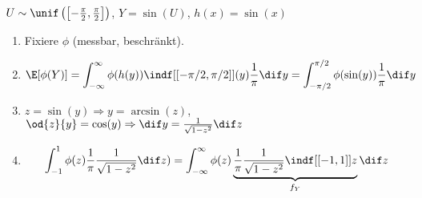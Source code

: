 \begin{example}
	$U \sim \unif \left( \left[ - \frac{\pi}{2} , \frac{\pi}{2} \right] \right)$, $Y = \sin (U)$, $ h(x) = \sin (x)$
	\begin{enumerate}
		\item Fixiere $\phi$ (messbar, beschränkt).
		\item \begin{equation*}
			\E [\phi (Y)] = \int_{- \infty}^{\infty} \phi(h(y)) \indf[{[-\pi/2 , \pi/2]}] (y) \frac{1}{\pi} \dif y
			= \int_{- \pi/2}^{\pi/2} \phi (\sin (y)) \frac{1}{\pi} \dif y
		\end{equation*}
	\item $ z = \sin (y) \Rightarrow y = \arcsin (z)$, $\od{z}{y} = \cos (y) \Rightarrow \dif y = \frac{1}{\sqrt{1 - z^2}} \dif z $
		\item \begin{equation*}
				\int_{-1}^{1} \phi (z) \frac{1}{\pi} \frac{1}{\sqrt{1 -z^2}} \dif z ) = \int_{- \infty}^{\infty} \phi (z)
				\underbrace{\frac{1}{\pi} \frac{1}{\sqrt{1-z^2}} \indf[{[-1,1]}] {z}}_{f_Y} \dif z
		\end{equation*}
	\end{enumerate}
\end{example}

